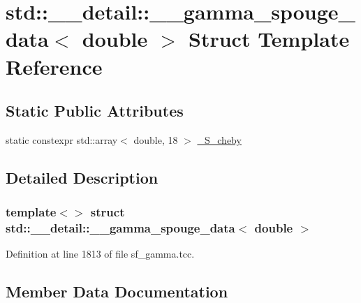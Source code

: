 \hypertarget{structstd_1_1____detail_1_1____gamma__spouge__data_3_01double_01_4}{}\section{std\+:\+:\+\_\+\+\_\+detail\+:\+:\+\_\+\+\_\+gamma\+\_\+spouge\+\_\+data$<$ double $>$ Struct Template Reference}
\label{structstd_1_1____detail_1_1____gamma__spouge__data_3_01double_01_4}
\subsection*{Static Public Attributes}
\begin{DoxyCompactItemize}
\item 
static constexpr std\+::array$<$ double, 18 $>$ \hyperlink{structstd_1_1____detail_1_1____gamma__spouge__data_3_01double_01_4_ae7638accff257079573b702a72e01254}{\+\_\+\+S\+\_\+cheby}
\end{DoxyCompactItemize}


\subsection{Detailed Description}
\subsubsection*{template$<$$>$\newline
struct std\+::\+\_\+\+\_\+detail\+::\+\_\+\+\_\+gamma\+\_\+spouge\+\_\+data$<$ double $>$}



Definition at line 1813 of file sf\+\_\+gamma.\+tcc.



\subsection{Member Data Documentation}
\mbox{\label{structstd_1_1____detail_1_1____gamma__spouge__data_3_01double_01_4_ae7638accff257079573b702a72e01254}} 
